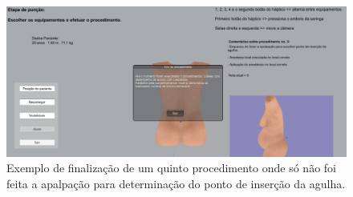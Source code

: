 \begin{figure}[ht!]
    \centering
    \includegraphics[width=\textwidth]{capitulos/figuras/sistema-exemplo-execucao-procedimento-5.png} 
    \caption{Exemplo de finalização de um quinto procedimento onde só não foi feita a apalpação para determinação do ponto de inserção da agulha.}
    \label{fig:sistemaExecucao5semApalpacao}
\end{figure}